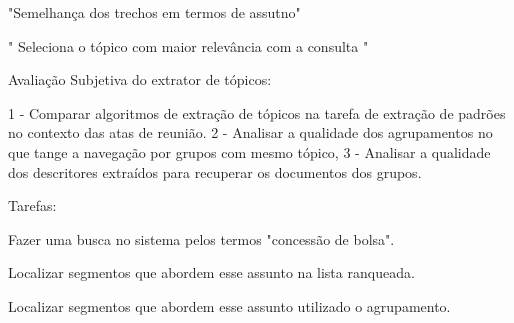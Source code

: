 
"Semelhança dos trechos em termos de assutno"

" Seleciona o tópico com maior relevância com a consulta "



















Avaliação Subjetiva do extrator de tópicos:

1 - Comparar algoritmos de extração de tópicos na tarefa de extração de padrões no contexto
das atas de reunião. 
2 - Analisar a qualidade dos agrupamentos no que tange a navegação por grupos com mesmo tópico, 
3 - Analisar a qualidade dos descritores extraídos para recuperar os documentos dos grupos.


Tarefas:

Fazer uma busca no sistema pelos termos "concessão de bolsa".

Localizar segmentos que abordem esse assunto na lista ranqueada.

Localizar segmentos que abordem esse assunto utilizado o agrupamento.

